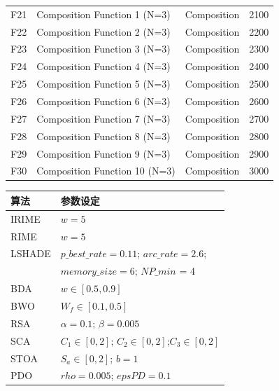 \documentclass{wzuthesis}
\begin{document}
\begin{table}[ht]
\begin{tabular}{l l l r}
F21 & Composition Function 1 (N=3)                     & Composition & 2100  \\
F22 & Composition Function 2 (N=3)                     & Composition & 2200  \\
F23 & Composition Function 3 (N=3)                     & Composition & 2300  \\
F24 & Composition Function 4 (N=3)                     & Composition & 2400  \\
F25 & Composition Function 5 (N=3)                     & Composition & 2500  \\
F26 & Composition Function 6 (N=3)                     & Composition & 2600  \\
F27 & Composition Function 7 (N=3)                     & Composition & 2700  \\
F28 & Composition Function 8 (N=3)                     & Composition & 2800  \\
F29 & Composition Function 9 (N=3)                     & Composition & 2900  \\
F30 & Composition Function 10 (N=3)                     & Composition & 3000  \\
\bottomrule
\end{tabular}
\end{table}

\begin{table}[htbp]
\centering
\small
{}
\begin{tabular}{ll}
\toprule
\textbf{算法} & \textbf{参数设定} \\
\midrule
IRIME & $w = 5$ \\
RIME & $w=5$ \\
LSHADE & $p\_best\_rate = 0.11$; $arc\_rate = 2.6$;\\ & $memory\_size = 6$; $NP\_min$ = 4\\
BDA & $w\in [0.5,0.9]$\\
BWO & $W_f \in [0.1,0.5]$\\
RSA & $\alpha = 0.1$; $\beta = 0.005$\\
SCA & $C_1 \in [0,2]$; $C_2 \in [0,2]$;$C_3 \in [0,2]$\\
STOA & $S_a \in [0,2]$; $b = 1$\\
PDO & $rho = 0.005$; $epsPD = 0.1$\\
\bottomrule
\end{tabular}
\label{tb:alg-parameters-1}
\end{table}
\end{document}
